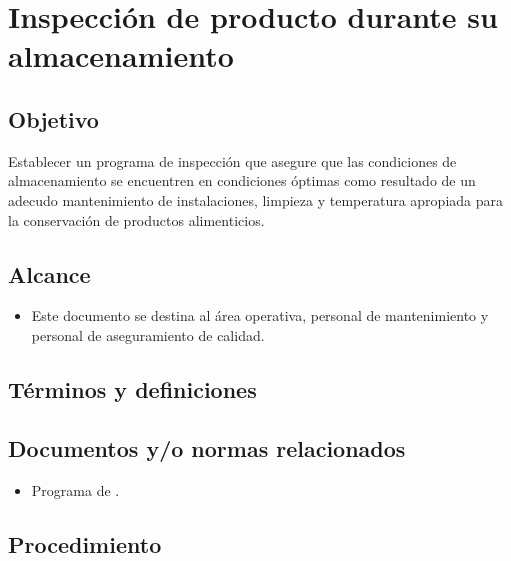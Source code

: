 \thispagestyle{formato-PI}
\renewcommand{\MayorVer}{2}
\renewcommand{\MenorVer}{0}
\renewcommand{\FechaPub}{2023--01}
\renewcommand{\TipoID}{PRO}
\renewcommand{\Titulo}{Inspección de producto durante su almacenamiento}

\section{\Titulo} \label{PRO:InspeccionDeAlimentosAlmacenados}
\renewcommand{\Codigo}{\Prog--\thesection--\TipoID}
\subsection{Objetivo}
Establecer un programa de inspección que asegure que las condiciones de almacenamiento se encuentren en condiciones óptimas como resultado de un adecudo mantenimiento de instalaciones, limpieza y temperatura apropiada para la conservación de productos alimenticios.

\subsection{Alcance}
\begin{itemize}
	\item Este documento se destina al área operativa, personal de mantenimiento y personal de aseguramiento de calidad.
\end{itemize}

\subsection{Términos y definiciones}
\begin{description}
\end{description}

\subsection{Documentos y/o normas relacionados}
\begin{itemize}
	\item Programa de .
\end{itemize}

\subsection{Procedimiento} \label{sec:pro:inspeccionDeProducto:almacenamiento}
